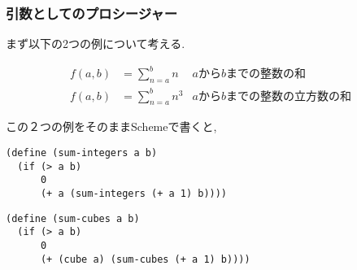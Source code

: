 \subsubsection{引数としてのプロシージャー}
まず以下の2つの例について考える.

\begin{align*}
  f(a, b) &= \sum_{n = a}^{b} n    &\text{$a$から$b$までの整数の和}\\
  f(a, b) &= \sum_{n = a}^{b} n^3  &\text{$a$から$b$までの整数の立方数の和}
\end{align*}

この２つの例をそのままSchemeで書くと,

\begin{lstlisting}[basicstyle=\footnotesize,title=$a$から$b$までの整数の和]
(define (sum-integers a b)
  (if (> a b)
      0
      (+ a (sum-integers (+ a 1) b))))
\end{lstlisting}

\begin{lstlisting}[basicstyle=\footnotesize,title=$a$から$b$までの整数の立方数の和]
(define (sum-cubes a b)
  (if (> a b)
      0
      (+ (cube a) (sum-cubes (+ a 1) b))))
\end{lstlisting}

